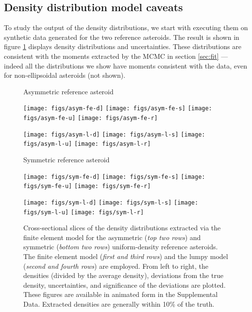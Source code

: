 \documentclass[fleqn,usenatbib]{mnras}
\begin{document}
\subsection{Density distribution model caveats}
\label{sec:density-compare}

To study the output of the density distributions, we start with executing them on synthetic data generated for the two reference asteroids. The result is shown in figure \ref{fig:den-uniform} displays density distributions and uncertainties. These distributions are consistent with the moments extracted by the MCMC in section \ref{sec:fit} --- indeed all the distributions we show have moments consistent with the data, even for non-ellipsoidal asteroids (not shown).

\begin{figure}
  Asymmetric reference asteroid

  \texttt{[image: figs/asym-fe-d]}\hfill
  \texttt{[image: figs/asym-fe-s]}\hfill
  \texttt{[image: figs/asym-fe-u]}\hfill
  \texttt{[image: figs/asym-fe-r]}
  
  \texttt{[image: figs/asym-l-d]}\hfill
  \texttt{[image: figs/asym-l-s]}\hfill
  \texttt{[image: figs/asym-l-u]}\hfill
  \texttt{[image: figs/asym-l-r]}

  \vspace{2em}
  Symmetric reference asteroid

  \texttt{[image: figs/sym-fe-d]}\hfill
  \texttt{[image: figs/sym-fe-s]}\hfill
  \texttt{[image: figs/sym-fe-u]}\hfill
  \texttt{[image: figs/sym-fe-r]}

  \texttt{[image: figs/sym-l-d]}\hfill
  \texttt{[image: figs/sym-l-s]}\hfill
  \texttt{[image: figs/sym-l-u]}\hfill
  \texttt{[image: figs/sym-l-r]}

  \caption{Cross-sectional slices of the density distributions extracted via the finite element model for the asymmetric (\textit{top two rows}) and symmetric (\textit{bottom two rows}) uniform-density reference asteroids. The finite element model (\textit{first and third rows}) and the lumpy model (\textit{second and fourth rows}) are employed. From left to right, the densities (divided by the average density), deviations from the true density, uncertainties, and significance of the deviations are plotted. These figures are available in animated form in the Supplemental Data. Extracted densities are generally within 10\% of the truth.}
  \label{fig:den-uniform}
\end{figure}
\end{document}
